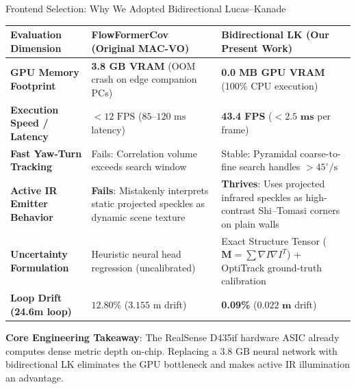 \documentclass[aspectratio=169, 10pt]{beamer}
\begin{document}
\begin{frame}{Frontend Selection: Why We Adopted Bidirectional Lucas--Kanade}
  \centering
  \renewcommand{\arraystretch}{1.15}
  \scriptsize
  \begin{tabular}{p{3.0cm} p{5.0cm} p{5.5cm}}
    \toprule
    \textbf{Evaluation Dimension} & \textbf{FlowFormerCov (Original MAC-VO)} & \textbf{Bidirectional LK (Our Present Work)} \\
    \midrule
    \textbf{GPU Memory Footprint} & \textbf{3.8 GB VRAM} (OOM crash on edge companion PCs) & \textbf{0.0 MB GPU VRAM} (100\% CPU execution) \\
    \textbf{Execution Speed / Latency} & $< 12\text{ FPS}$ ($85\text{--}120\text{ ms}$ latency) & \textbf{43.4 FPS} ($\mathbf{< 2.5\text{ ms}}$ per frame) \\
    \textbf{Fast Yaw-Turn Tracking} & Fails: Correlation volume exceeds search window & Stable: Pyramidal coarse-to-fine search handles $>45^\circ/\text{s}$ \\
    \textbf{Active IR Emitter Behavior} & \textbf{Fails}: Mistakenly interprets static projected speckles as dynamic scene texture & \textbf{Thrives}: Uses projected infrared speckles as high-contrast Shi--Tomasi corners on plain walls \\
    \textbf{Uncertainty Formulation} & Heuristic neural head regression (uncalibrated) & Exact Structure Tensor ($\mathbf{M} = \sum \nabla I \nabla I^T$) + OptiTrack ground-truth calibration \\
    \textbf{Loop Drift (24.6m loop)} & $12.80\%$ ($3.155\text{ m}$ drift) & \textbf{0.09\%} ($\mathbf{0.022\text{ m}}$ drift) \\
    \bottomrule
  \end{tabular}

  \vspace{0.25cm}
  {\footnotesize \textbf{Core Engineering Takeaway}: The RealSense D435if hardware ASIC already computes dense metric depth on-chip. Replacing a 3.8 GB neural network with bidirectional LK eliminates the GPU bottleneck and makes active IR illumination an advantage.}
\end{frame}
\end{document}
